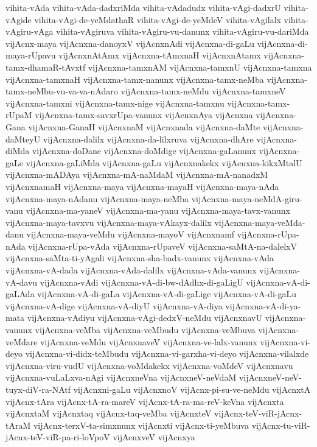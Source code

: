 {vihita-vAda
vihita-vAda-dadxriMda
vihita-vAdadudx
vihita-vAgi-dadxrU
vihita-vAgide
vihita-vAgi-de-yeMdathaR
vihita-vAgi-de-yeMdeV
vihita-vAgilalx
vihita-vAgiru-vAga
vihita-vAgiruva
vihita-vAgiru-vu-danunx
vihita-vAgiru-vu-dariMda
vijAcnx-maya
vijAcnxna-danoyxV
vijAcnxnAdi
vijAcnxna-di-gaLu
vijAcnxna-di-maya-rUpavu
vijAcnxnAtAmx
vijAcnxna-tAmxnaH
vijAcnxnAtamx
vijAcnxna-tamx-dhamaR-tAvxtf
vijAcnxna-tamxnAM
vijAcnxna-tamxnU
vijAcnxna-tamxna
vijAcnxna-tamxnaH
vijAcnxna-tamx-nanunx
vijAcnxna-tamx-neMba
vijAcnxna-tamx-neMbu-vu-va-va-nAdaro
vijAcnxna-tamx-neMdu
vijAcnxna-tamxneV
vijAcnxna-tamxni
vijAcnxna-tamx-nige
vijAcnxna-tamxnu
vijAcnxna-tamx-rUpaM
vijAcnxna-tamx-savxrUpa-vanunx
vijAcnxnAya
vijAcnxna
vijAcnxna-Gana
vijAcnxna-GanaH
vijAcnxnaM
vijAcnxnada
vijAcnxna-daMte
vijAcnxna-daMteyU
vijAcnxna-dalilx
vijAcnxna-da-lilxruva
vijAcnxna-dhAre
vijAcnxna-diMda
vijAcnxna-doDane
vijAcnxna-doMdige
vijAcnxna-gaLanunx
vijAcnxna-gaLe
vijAcnxna-gaLiMda
vijAcnxna-gaLu
vijAcnxnakekx
vijAcnxna-kikxMtalU
vijAcnxna-mADAya
vijAcnxna-mA-naMdaM
vijAcnxna-mA-nanadxM
vijAcnxnamaH
vijAcnxna-maya
vijAcnxna-mayaH
vijAcnxna-maya-nAda
vijAcnxna-maya-nAdanu
vijAcnxna-maya-neMba
vijAcnxna-maya-neMdA-giru-vanu
vijAcnxna-ma-yaneV
vijAcnxna-ma-yanu
vijAcnxna-maya-tavx-vanunx
vijAcnxna-maya-tavxvu
vijAcnxna-maya-vAkayx-dalilx
vijAcnxna-maya-veMda-danu
vijAcnxna-maya-veMdu
vijAcnxna-mayoV
vijAcnxnamf
vijAcnxna-rUpa-nAda
vijAcnxna-rUpa-vAda
vijAcnxna-rUpaveV
vijAcnxna-saMtA-na-dalelxV
vijAcnxna-saMta-ti-yAgali
vijAcnxna-sha-badx-vanunx
vijAcnxna-vAda
vijAcnxna-vA-dada
vijAcnxna-vAda-dalilx
vijAcnxna-vAda-vanunx
vijAcnxna-vA-davu
vijAcnxna-vAdi
vijAcnxna-vA-di-bw-dAdhx-di-gaLigU
vijAcnxna-vA-di-gaLAda
vijAcnxna-vA-di-gaLa
vijAcnxna-vA-di-gaLige
vijAcnxna-vA-di-gaLu
vijAcnxna-vA-dige
vijAcnxna-vA-diyU
vijAcnxna-vA-diya
vijAcnxna-vA-di-ya-mata
vijAcnxna-vAdiyu
vijAcnxna-vAgi-dedxV-neMdu
vijAcnxnavU
vijAcnxna-vanunx
vijAcnxna-veMba
vijAcnxna-veMbudu
vijAcnxna-veMbuva
vijAcnxna-veMdare
vijAcnxna-veMdu
vijAcnxnaveV
vijAcnxna-ve-lalx-vanunx
vijAcnxna-vi-deyo
vijAcnxna-vi-didx-teMbudu
vijAcnxna-vi-garxha-vi-deyo
vijAcnxna-vilalxde
vijAcnxna-viru-vudU
vijAcnxna-voMdakekx
vijAcnxna-voMdeV
vijAcnxnavu
vijAcnxna-vuLaLxva-nAgi
vijAcnxneVna
vijAcnxneV-neVdaM
vijAcnxneV-neV-tuyx-diV-ra-NAtf
vijAcnxni-gaLu
vijAcnxnoV
vijAcnx-pi-su-ve-neMdu
vijAcnxtA
vijAcnx-tAra
vijAcnx-tA-ra-mareV
vijAcnx-tA-ra-ma-reV-keVna
vijAcnxta
vijAcnxtaM
vijAcnxtaq
vijAcnx-taq-veMba
vijAcnxteV
vijAcnx-teV-viR-jAcnx-tAraM
vijAcnx-terxV-ta-simxnunx
vijAcnxti
vijAcnx-ti-yeMbuva
vijAcnx-tu-viR-jAcnx-teV-viR-pa-ri-loVpoV
vijAcnxveV
vijAcnxya
}
